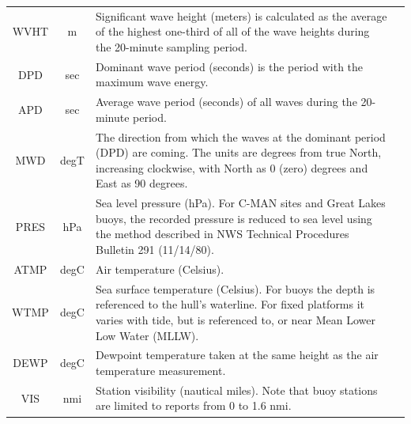 \begin{onehalfspace}
\begin{itemize}
\begin{table}[ht!]
\begin{tabular}{ccm{11.00cm}@{\setlength{\tabcolsep}{0pt}}m{0.0cm}}
					\cellcolor{gray090} WVHT & \cellcolor{gray090} m & \cellcolor{gray090} Significant wave height (meters) is calculated as the average of the highest one-third of all of the wave heights during the 20-minute sampling period. \\
					
					DPD & sec & Dominant wave period (seconds) is the period with the maximum wave energy. \\
					
					\cellcolor{gray090}APD & \cellcolor{gray090} sec & \cellcolor{gray090} Average wave period (seconds) of all waves during the 20-minute period. \\
					
					MWD & degT & The direction from which the waves at the dominant period (DPD) are coming. The units are degrees from true North, increasing clockwise, with North as 0 (zero) degrees and East as 90 degrees. \\
					
					\cellcolor{gray090}PRES & \cellcolor{gray090} hPa & \cellcolor{gray090} Sea level pressure (hPa). For C-MAN sites and Great Lakes buoys, the recorded pressure is reduced to sea level using the method described in NWS Technical Procedures Bulletin 291 (11/14/80). \\
					
					ATMP & degC & Air temperature (Celsius). &\\[0.10cm]
					
					\cellcolor{gray090}WTMP & \cellcolor{gray090} degC & \cellcolor{gray090} Sea surface temperature (Celsius). For buoys the depth is referenced to the hull's waterline. For fixed platforms it varies with tide, but is referenced to, or near Mean Lower Low Water (MLLW).\\
					
					DEWP & degC & Dewpoint temperature taken at the same height as the air temperature measurement. \\
					
					\cellcolor{gray090}VIS & \cellcolor{gray090} nmi & \cellcolor{gray090} Station visibility (nautical miles). Note that buoy stations are limited to reports from 0 to 1.6 nmi. \\
					
					

\end{tabular}
\end{table}
\end{itemize}
\end{onehalfspace}

